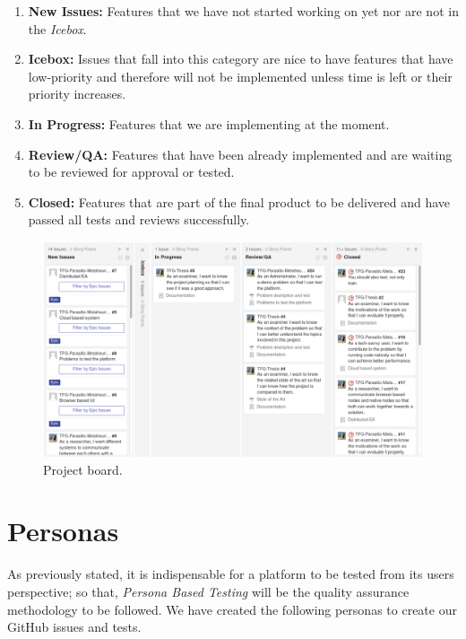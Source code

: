 \begin{enumerate}
	\item \textbf{New Issues:} Features that we have not started working on yet nor are not in the \textit{Icebox}.
	
	\item \textbf{Icebox:} Issues that fall into this category are nice to have features that have low-priority and therefore will not be implemented unless time is left or their priority increases.  
	
	\item \textbf{In Progress:} Features that we are implementing at the moment.
	
	\item \textbf{Review/QA:} Features that have been already implemented and are waiting to be reviewed for approval or tested.
	
	\item \textbf{Closed:} Features that are part of the final product to be delivered and have passed all tests and reviews successfully.
\end{enumerate}

\begin{figure}[h!]
		\centering
    	\includegraphics[width=\linewidth]{assets/images/board.png}
    	\caption{Project board.}
    	\label{fig:board}
\end{figure}


\newcommand{\tabitem}{~~\llap{\textbullet}~~}
\section{Personas}
As previously stated, it is indispensable for a platform to be tested from its users perspective; so that, \textit{Persona Based Testing} will be the quality assurance methodology to be followed. We have created the following personas to create our GitHub issues and tests.

